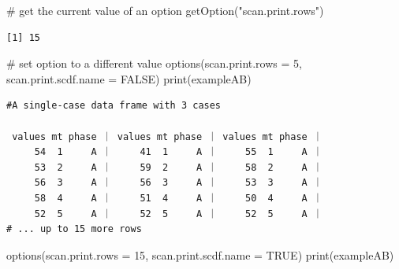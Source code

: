 \documentclass[
  letterpaper,
  DIV=11,
  numbers=noendperiod]{scrreprt}
\newenvironment{Shaded}{\begin{snugshade}}{\end{snugshade}}
\newcommand{\AttributeTok}[1]{\textcolor[rgb]{0.40,0.45,0.13}{#1}}
\newcommand{\CommentTok}[1]{\textcolor[rgb]{0.37,0.37,0.37}{#1}}
\newcommand{\ConstantTok}[1]{\textcolor[rgb]{0.56,0.35,0.01}{#1}}
\newcommand{\DecValTok}[1]{\textcolor[rgb]{0.68,0.00,0.00}{#1}}
\newcommand{\FunctionTok}[1]{\textcolor[rgb]{0.28,0.35,0.67}{#1}}
\newcommand{\NormalTok}[1]{\textcolor[rgb]{0.00,0.23,0.31}{#1}}
\newcommand{\StringTok}[1]{\textcolor[rgb]{0.13,0.47,0.30}{#1}}
\begin{document}
\begin{Shaded}
\begin{Highlighting}[]
\CommentTok{\# get the current value of an option}
\FunctionTok{getOption}\NormalTok{(}\StringTok{"scan.print.rows"}\NormalTok{)}
\end{Highlighting}
\end{Shaded}

\begin{verbatim}
[1] 15
\end{verbatim}

\begin{Shaded}
\begin{Highlighting}[]
\CommentTok{\# set option to a different value}
\FunctionTok{options}\NormalTok{(}\AttributeTok{scan.print.rows =} \DecValTok{5}\NormalTok{, }\AttributeTok{scan.print.scdf.name =} \ConstantTok{FALSE}\NormalTok{)}
\FunctionTok{print}\NormalTok{(exampleAB)}
\end{Highlighting}
\end{Shaded}

\begin{verbatim}
#A single-case data frame with 3 cases

 values mt phase ｜ values mt phase ｜ values mt phase ｜
     54  1     A ｜     41  1     A ｜     55  1     A ｜
     53  2     A ｜     59  2     A ｜     58  2     A ｜
     56  3     A ｜     56  3     A ｜     53  3     A ｜
     58  4     A ｜     51  4     A ｜     50  4     A ｜
     52  5     A ｜     52  5     A ｜     52  5     A ｜
# ... up to 15 more rows
\end{verbatim}

\begin{Shaded}
\begin{Highlighting}[]
\FunctionTok{options}\NormalTok{(}\AttributeTok{scan.print.rows =} \DecValTok{15}\NormalTok{, }\AttributeTok{scan.print.scdf.name =} \ConstantTok{TRUE}\NormalTok{)}
\FunctionTok{print}\NormalTok{(exampleAB)}
\end{Highlighting}
\end{Shaded}
\end{document}
